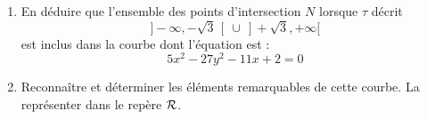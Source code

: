 \begin{enumerate}
  \item En déduire que l'ensemble des points d'intersection $N$ lorsque $\tau$ décrit 
\begin{displaymath}
 ]-\infty,-\sqrt 3 \,[ \: \cup \: ]+\sqrt 3,+\infty[
\end{displaymath}
  est inclus dans la courbe dont l'équation est :
\begin{displaymath}
 5x^2-27y^2 - 11x+2=0
\end{displaymath}
  \item Reconnaître et déterminer les éléments remarquables de cette
  courbe. La représenter dans le repère  $\cal R$.
\end{enumerate}
